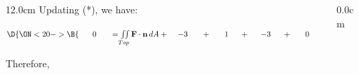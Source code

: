 \begin{frame}
\begin{columns}
\begin{column}{12.0cm}
Updating (*), we have:

%

\vspace{0.4cm}

$\D{
\ON<20->{\B{\hspace{0.6cm} 0 \hspace{0.6cm} = \iint \limits_{Top} {\bf F} \cdot {\bf n}\, dA + \hspace{0.4cm} -3 \hspace{0.6cm} + \hspace{0.6cm} 1 \hspace{0.5cm} + \hspace{0.5cm} -3 \hspace{0.5cm} + \hspace{0.6cm} 0 \hspace{0.6cm} + \hspace{0.6cm} 0 }}}$

\vspace{0.2cm}

Therefore, 

\end{column}\begin{column}{0.0cm}\end{column}\end{columns}
\end{frame}
